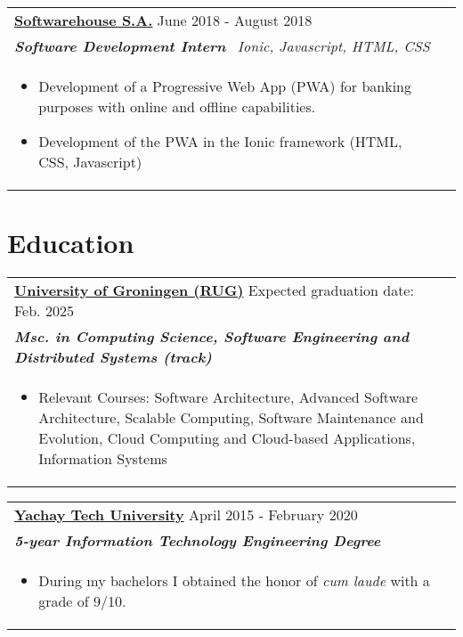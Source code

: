 \documentclass[a4paper,8pt]{article}
\begin{document}
\begin{tabularx}{\linewidth}{ @{}l r@{} }
\textbf{\uline{\href{https://www.fit-bank.com/}{Softwarehouse S.A.}}} \hfill \color[HTML]{371e77} June 2018 - August 2018 \\[4pt]
\color[HTML]{371e77}\textbf{\textit{Software Development Intern}}\ \hfill \color[HTML]{4B28A4} \textit{Ionic, Javascript, HTML, CSS} \\[5pt]
\begin{minipage}[t]{\linewidth}
    \begin{itemize}[nosep,after=\strut, leftmargin=2em, itemsep=2pt]
        \item Development of a Progressive Web App (PWA) for banking purposes with online and offline capabilities.
        \item Development of the PWA in the Ionic framework (HTML, CSS, Javascript)
    \end{itemize}
\end{minipage}
\end{tabularx}


\section{Education}

\begin{tabularx}{\linewidth}{ @{}l r@{} }
\color[HTML]{1C033C} \textbf{\uline{University of Groningen (RUG)}} \hfill  \color[HTML]{371e77} Expected graduation date: Feb. 2025 \\[4pt]
\color[HTML]{371e77}\textbf{\textit{Msc. in Computing Science, Software Engineering and Distributed Systems (track)}}\ \hfill \color[HTML]{4B28A4} \\[5pt]
\begin{minipage}[t]{\linewidth}
    \begin{itemize}[nosep,after=\strut, leftmargin=2em, itemsep=2pt]
        \item Relevant Courses: Software Architecture, Advanced Software Architecture, Scalable Computing, Software Maintenance and Evolution, Cloud Computing and Cloud-based Applications, Information Systems
    \end{itemize}
\end{minipage}
\end{tabularx}


\begin{tabularx}{\linewidth}{ @{}l r@{} }
\color[HTML]{1C033C} \textbf{\uline{Yachay Tech University}} \hfill \color[HTML]{371e77} April 2015 - February 2020 \\[4pt]
\color[HTML]{371e77}\textbf{\textit{5-year Information Technology Engineering Degree}}\ \hfill \color[HTML]{4B28A4} \\[5pt]
\begin{minipage}[t]{\linewidth}
    \begin{itemize}[nosep,after=\strut, leftmargin=2em, itemsep=2pt]
        \item During my bachelors I obtained the honor of \textit{cum laude} with a grade of 9/10.
    \end{itemize}
\end{minipage}
\end{tabularx}
\end{document}
